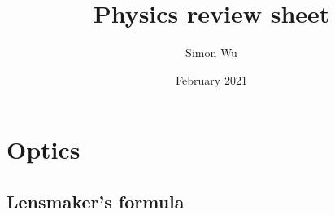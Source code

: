 \documentclass[12pt]{article}
\title{Physics review sheet}
\author{Simon Wu }
\date{February 2021}
\begin{document}
\maketitle

\tableofcontents


\newpage









\section{Optics}

\subsection{Lensmaker's formula}
\end{document}
